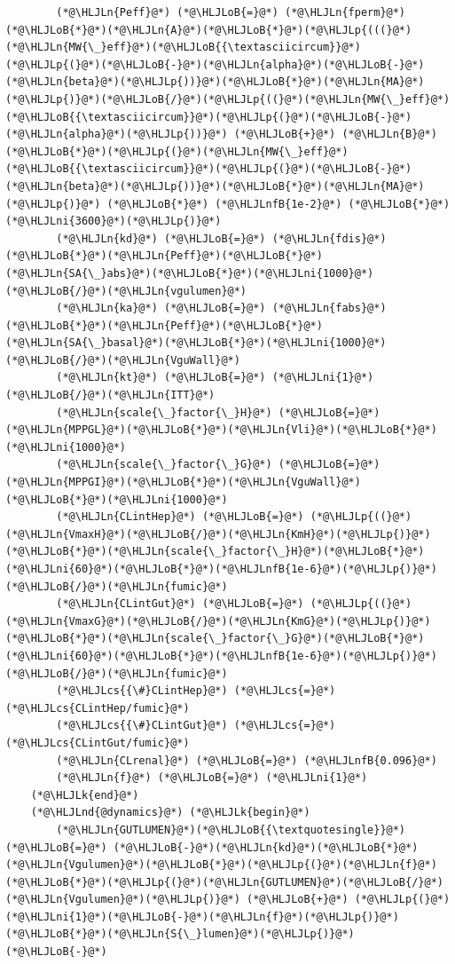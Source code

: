 \documentclass[12pt,a4paper]{article}
\newcommand{\HLJLk}[1]{\textcolor[RGB]{148,91,176}{\textbf{#1}}}
\newcommand{\HLJLn}[1]{#1}
\newcommand{\HLJLnd}[1]{\textcolor[RGB]{214,102,97}{#1}}
\newcommand{\HLJLnfB}[1]{\textcolor[RGB]{59,151,46}{#1}}
\newcommand{\HLJLni}[1]{\textcolor[RGB]{59,151,46}{#1}}
\newcommand{\HLJLoB}[1]{\textcolor[RGB]{102,102,102}{\textbf{#1}}}
\newcommand{\HLJLp}[1]{#1}
\newcommand{\HLJLcs}[1]{\textcolor[RGB]{153,153,119}{\textit{#1}}}
\begin{document}
\begin{lstlisting}
        (*@\HLJLn{Peff}@*) (*@\HLJLoB{=}@*) (*@\HLJLn{fperm}@*)(*@\HLJLoB{*}@*)(*@\HLJLn{A}@*)(*@\HLJLoB{*}@*)(*@\HLJLp{(((}@*)(*@\HLJLn{MW{\_}eff}@*)(*@\HLJLoB{{\textasciicircum}}@*)(*@\HLJLp{(}@*)(*@\HLJLoB{-}@*)(*@\HLJLn{alpha}@*)(*@\HLJLoB{-}@*)(*@\HLJLn{beta}@*)(*@\HLJLp{))}@*)(*@\HLJLoB{*}@*)(*@\HLJLn{MA}@*)(*@\HLJLp{)}@*)(*@\HLJLoB{/}@*)(*@\HLJLp{((}@*)(*@\HLJLn{MW{\_}eff}@*)(*@\HLJLoB{{\textasciicircum}}@*)(*@\HLJLp{(}@*)(*@\HLJLoB{-}@*)(*@\HLJLn{alpha}@*)(*@\HLJLp{))}@*) (*@\HLJLoB{+}@*) (*@\HLJLn{B}@*)(*@\HLJLoB{*}@*)(*@\HLJLp{(}@*)(*@\HLJLn{MW{\_}eff}@*)(*@\HLJLoB{{\textasciicircum}}@*)(*@\HLJLp{(}@*)(*@\HLJLoB{-}@*)(*@\HLJLn{beta}@*)(*@\HLJLp{))}@*)(*@\HLJLoB{*}@*)(*@\HLJLn{MA}@*)(*@\HLJLp{)}@*) (*@\HLJLoB{*}@*) (*@\HLJLnfB{1e-2}@*) (*@\HLJLoB{*}@*) (*@\HLJLni{3600}@*)(*@\HLJLp{)}@*)
        (*@\HLJLn{kd}@*) (*@\HLJLoB{=}@*) (*@\HLJLn{fdis}@*)(*@\HLJLoB{*}@*)(*@\HLJLn{Peff}@*)(*@\HLJLoB{*}@*)(*@\HLJLn{SA{\_}abs}@*)(*@\HLJLoB{*}@*)(*@\HLJLni{1000}@*)(*@\HLJLoB{/}@*)(*@\HLJLn{vgulumen}@*)
        (*@\HLJLn{ka}@*) (*@\HLJLoB{=}@*) (*@\HLJLn{fabs}@*)(*@\HLJLoB{*}@*)(*@\HLJLn{Peff}@*)(*@\HLJLoB{*}@*)(*@\HLJLn{SA{\_}basal}@*)(*@\HLJLoB{*}@*)(*@\HLJLni{1000}@*)(*@\HLJLoB{/}@*)(*@\HLJLn{VguWall}@*)
        (*@\HLJLn{kt}@*) (*@\HLJLoB{=}@*) (*@\HLJLni{1}@*)(*@\HLJLoB{/}@*)(*@\HLJLn{ITT}@*)
        (*@\HLJLn{scale{\_}factor{\_}H}@*) (*@\HLJLoB{=}@*) (*@\HLJLn{MPPGL}@*)(*@\HLJLoB{*}@*)(*@\HLJLn{Vli}@*)(*@\HLJLoB{*}@*)(*@\HLJLni{1000}@*)
        (*@\HLJLn{scale{\_}factor{\_}G}@*) (*@\HLJLoB{=}@*) (*@\HLJLn{MPPGI}@*)(*@\HLJLoB{*}@*)(*@\HLJLn{VguWall}@*)(*@\HLJLoB{*}@*)(*@\HLJLni{1000}@*)
        (*@\HLJLn{CLintHep}@*) (*@\HLJLoB{=}@*) (*@\HLJLp{((}@*)(*@\HLJLn{VmaxH}@*)(*@\HLJLoB{/}@*)(*@\HLJLn{KmH}@*)(*@\HLJLp{)}@*)(*@\HLJLoB{*}@*)(*@\HLJLn{scale{\_}factor{\_}H}@*)(*@\HLJLoB{*}@*)(*@\HLJLni{60}@*)(*@\HLJLoB{*}@*)(*@\HLJLnfB{1e-6}@*)(*@\HLJLp{)}@*)(*@\HLJLoB{/}@*)(*@\HLJLn{fumic}@*)
        (*@\HLJLn{CLintGut}@*) (*@\HLJLoB{=}@*) (*@\HLJLp{((}@*)(*@\HLJLn{VmaxG}@*)(*@\HLJLoB{/}@*)(*@\HLJLn{KmG}@*)(*@\HLJLp{)}@*)(*@\HLJLoB{*}@*)(*@\HLJLn{scale{\_}factor{\_}G}@*)(*@\HLJLoB{*}@*)(*@\HLJLni{60}@*)(*@\HLJLoB{*}@*)(*@\HLJLnfB{1e-6}@*)(*@\HLJLp{)}@*)(*@\HLJLoB{/}@*)(*@\HLJLn{fumic}@*)
        (*@\HLJLcs{{\#}CLintHep}@*) (*@\HLJLcs{=}@*) (*@\HLJLcs{CLintHep/fumic}@*)
        (*@\HLJLcs{{\#}CLintGut}@*) (*@\HLJLcs{=}@*) (*@\HLJLcs{CLintGut/fumic}@*)
        (*@\HLJLn{CLrenal}@*) (*@\HLJLoB{=}@*) (*@\HLJLnfB{0.096}@*)
        (*@\HLJLn{f}@*) (*@\HLJLoB{=}@*) (*@\HLJLni{1}@*)
    (*@\HLJLk{end}@*)
    (*@\HLJLnd{@dynamics}@*) (*@\HLJLk{begin}@*)
        (*@\HLJLn{GUTLUMEN}@*)(*@\HLJLoB{{\textquotesingle}}@*) (*@\HLJLoB{=}@*) (*@\HLJLoB{-}@*)(*@\HLJLn{kd}@*)(*@\HLJLoB{*}@*)(*@\HLJLn{Vgulumen}@*)(*@\HLJLoB{*}@*)(*@\HLJLp{(}@*)(*@\HLJLn{f}@*)(*@\HLJLoB{*}@*)(*@\HLJLp{(}@*)(*@\HLJLn{GUTLUMEN}@*)(*@\HLJLoB{/}@*)(*@\HLJLn{Vgulumen}@*)(*@\HLJLp{)}@*) (*@\HLJLoB{+}@*) (*@\HLJLp{(}@*)(*@\HLJLni{1}@*)(*@\HLJLoB{-}@*)(*@\HLJLn{f}@*)(*@\HLJLp{)}@*)(*@\HLJLoB{*}@*)(*@\HLJLn{S{\_}lumen}@*)(*@\HLJLp{)}@*) (*@\HLJLoB{-}@*)

\end{lstlisting}
\end{document}
